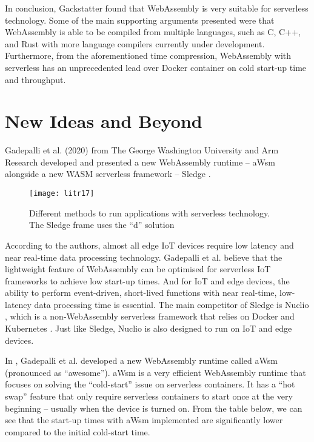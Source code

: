 In conclusion, Gackstatter found that WebAssembly is very suitable for serverless technology. Some of the main supporting arguments presented were that WebAssembly is able to be compiled from multiple languages, such as C, C++, and Rust with more language compilers currently under development. Furthermore, from the aforementioned time compression, WebAssembly with serverless has an unprecedented lead over Docker container on cold start-up time and throughput.

\bigskip
\section{New Ideas and Beyond}

Gadepalli et al. (2020) from The George Washington University and Arm Research developed and presented a new WebAssembly runtime – aWsm alongside a new WASM serverless framework – Sledge \cite{lit33} \cite{lit34}.

\newpage
\bigskip
\begin{figure}[hp]
\centering
\texttt{[image: litr17]}
\caption{\footnotesize{Different methods to run applications with serverless technology. The Sledge frame uses the “d” solution \cite{lit34}}}
\captionsetup{aboveskip=0pt,font=it}
\end{figure}
\bigskip

According to the authors, almost all edge IoT devices require low latency and near real-time data processing technology. Gadepalli et al. believe that the lightweight feature of WebAssembly can be optimised for serverless IoT frameworks to achieve low start-up times. And for IoT and edge devices, the ability to perform event-driven, short-lived functions with near real-time, low-latency data processing time is essential. The main competitor of Sledge is Nuclio \cite{lit35}, which is a non-WebAssembly serverless framework that relies on Docker and Kubernetes \cite{lit36}. Just like Sledge, Nuclio is also designed to run on IoT and edge devices.

In \cite{lit33}, Gadepalli et al. developed a new WebAssembly runtime called aWsm (pronounced as “awesome”). aWsm is a very efficient WebAssembly runtime that focuses on solving the “cold-start” issue on serverless containers. It has a “hot swap” feature that only require serverless containers to start once at the very beginning – usually when the device is turned on. From the table below, we can see that the start-up times with aWsm implemented are significantly lower compared to the initial cold-start time.

